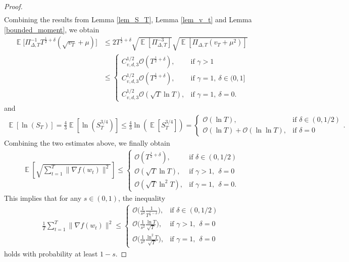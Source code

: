 \documentclass{article} %
\DeclareMathOperator{\Expect}{\mathbb{E}}
\begin{document}
\begin{proof}
\begin{align*}
\end{align*}
Combining the results from Lemma \ref{lem_S_T}, Lemma \ref{lem_v_t} and Lemma \ref{bounded_moment}, we obtain
\begin{align*}
   \Expect\big[\Pi_{\Delta,T}^{-1}T^{\frac{1}{2}+\delta}(\sqrt{v_{T}}+\mu)\big]&\le 2T^{\frac{1}{2}+\delta}\sqrt{\Expect[\Pi^{-3}_{\Delta,T}] }\sqrt{\Expect[\Pi_{\Delta,T}(v_{T}+\mu^{2})]}\\&\le \begin{cases} 
C^{1/2}_{v,d,3}\mathcal{O}(T^{\frac{1}{2}+\delta}), & \text{if } \gamma>1 \\
C^{1/2}_{v,d,3}\mathcal{O}({T}^{\frac{1}{2}+\delta}), & \text{if } \gamma=1,\ \delta \in(0,1]\\ C^{1/2}_{v,d,3}\mathcal{O}(\sqrt{T}\ln T), & \text{if } \gamma=1,\ \delta=0.\end{cases}
\end{align*} and
\begin{align*}
    \Expect[\ln(S_{T})]=\frac{4}{3}\Expect[\ln(S^{3/4}_{T})]\le \frac{4}{3}\ln(\Expect[S^{3/4}_{T}])=\begin{cases} 
\mathcal{O}(\ln T), & \text{if } \delta\in(0,1/2) \\
\mathcal{O}(\ln T)+\mathcal{O}(\ln\ln T), & \text{if } \delta = 0\end{cases}.
\end{align*}
Combining the two estimates above, we finally obtain
\begin{align}\label{sqrt}
 \Expect\left[\sqrt{\sum_{t=1}^{T}\|\nabla f(w_{t})\|^{2}}\right]\le  \begin{cases} 
\mathcal{O}(T^{\frac{1}{2}+\delta}), & \text{if }\delta\in(0,1/2)  \\
\mathcal{O}(\sqrt{T}\ln T), & \text{if } \gamma>1,\ \ \delta = 0\\
\mathcal{O}(\sqrt{T}\ln^{2} T), & \text{if } \gamma=1,\ \ \delta = 0.\end{cases}  
\end{align}
This implies that for any \( s \in (0,1) \), the inequality \begin{align*}
 \frac{1}{T}\sum_{t=1}^{T}\|\nabla f(w_{t})\|^{2}\le  \begin{cases} 
\mathcal{O}\Big(\frac{1}{s^2}\frac{1}{T^{\frac{1}{2}-\delta}}\Big), & \text{if }\delta\in(0,1/2)  \\
\mathcal{O}\Big(\frac{1}{s^2}\frac{\ln T}{\sqrt{T}}\Big), & \text{if } \gamma>1,\ \ \delta = 0\\
\mathcal{O}\Big(\frac{1}{s^2}\frac{\ln^{2} T}{\sqrt{T}}\Big), & \text{if } \gamma=1,\ \ \delta = 0\end{cases} \tag*{\qedhere}
\end{align*}
holds with probability at least \( 1 - s \).

\end{proof}
\end{document}
